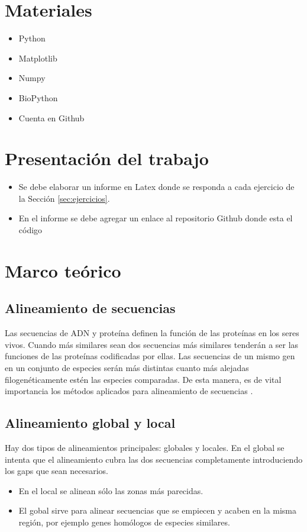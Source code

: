 \documentclass{article}
\begin{document}
\section{Materiales}
\begin{itemize}
    \item Python
    \item Matplotlib 
    \item Numpy 
    \item BioPython
    \item Cuenta en Github
\end{itemize}

\section{Presentación del trabajo}
\begin{itemize}
    \item Se debe elaborar un informe en Latex donde se responda a cada ejercicio de la Sección \ref{sec:ejercicios}.
    \item En el informe se debe agregar un enlace al repositorio Github donde esta el código 
\end{itemize}

\clearpage

\section{Marco teórico}

\subsection{Alineamiento de secuencias}
Las secuencias de ADN y proteína definen la función de las proteínas en los seres vivos. Cuando más similares sean dos secuencias más similares tenderán a ser las funciones de las proteínas codificadas por ellas. Las secuencias de un mismo gen en un conjunto de especies serán más distintas cuanto más alejadas filogenéticamente estén las especies comparadas. De esta manera, es de vital importancia los métodos aplicados para alineamiento de secuencias \cite{comav2020}. 

\subsection{Alineamiento global y local}
Hay dos tipos de alineamientos principales: globales y locales. En el global se intenta que el alineamiento cubra las dos secuencias completamente introduciendo los gaps que sean necesarios. 
\begin{itemize}
    \item  En el local se alinean sólo las zonas más parecidas.
    \item  El gobal sirve para alinear secuencias que se empiecen y acaben en la misma región, por ejemplo genes homólogos de especies similares.
\end{itemize}
\end{document}

